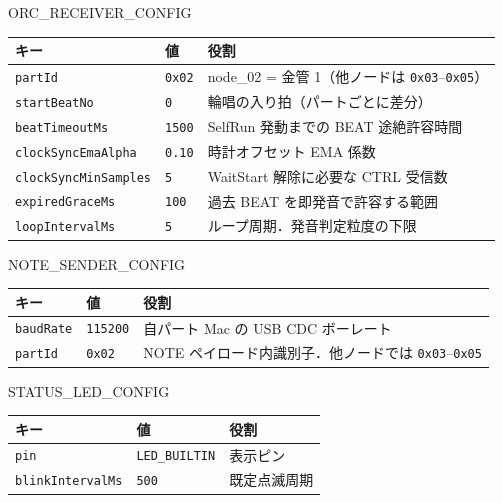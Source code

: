 \documentclass[lualatex,book,paper=a4paper,jafontsize=11.5pt,jafontscale=1.05]{jlreq}
\begin{document}
\begin{apibox}{ORC\_RECEIVER\_CONFIG}
\begin{tabular}{l l p{}}
\toprule
\textbf{キー} & \textbf{値} & \textbf{役割} \\
\midrule
\texttt{partId}              & \texttt{0x02}  & node\_02 = 金管 1（他ノードは \texttt{0x03}--\texttt{0x05}） \\
\texttt{startBeatNo}         & \texttt{0}     & 輪唱の入り拍（パートごとに差分） \\
\texttt{beatTimeoutMs}       & \texttt{1500}  & SelfRun 発動までの BEAT 途絶許容時間 \\
\texttt{clockSyncEmaAlpha}   & \texttt{0.10}  & 時計オフセット EMA 係数 \\
\texttt{clockSyncMinSamples} & \texttt{5}     & WaitStart 解除に必要な CTRL 受信数 \\
\texttt{expiredGraceMs}      & \texttt{100}   & 過去 BEAT を即発音で許容する範囲 \\
\texttt{loopIntervalMs}      & \texttt{5}     & ループ周期．発音判定粒度の下限 \\
\bottomrule
\end{tabular}
\end{apibox}

\begin{apibox}{NOTE\_SENDER\_CONFIG}
\begin{tabular}{l l p{}}
\toprule
\textbf{キー} & \textbf{値} & \textbf{役割} \\
\midrule
\texttt{baudRate} & \texttt{115200} & 自パート Mac の USB CDC ボーレート \\
\texttt{partId}   & \texttt{0x02}   & NOTE ペイロード内識別子．他ノードでは \texttt{0x03}--\texttt{0x05} \\
\bottomrule
\end{tabular}
\end{apibox}

\begin{apibox}{STATUS\_LED\_CONFIG}
\begin{tabular}{l l p{}}
\toprule
\textbf{キー} & \textbf{値} & \textbf{役割} \\
\midrule
\texttt{pin}             & \texttt{LED\_BUILTIN} & 表示ピン \\
\texttt{blinkIntervalMs} & \texttt{500}          & 既定点滅周期 \\
\bottomrule
\end{tabular}
\end{apibox}
\end{document}
